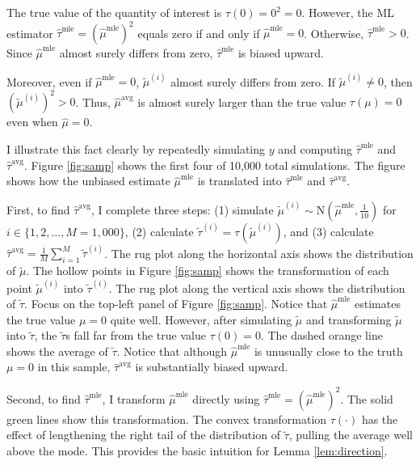 \documentclass[12pt]{article}
\begin{document}
The true value of the quantity of interest is $\tau(0) = 0^2 = 0$. However, the ML estimator $\hat{\tau}^\text{mle} = \left( \hat{\mu}^\text{mle} \right)^2$ equals zero if and only if $\hat{\mu}^\text{mle} = 0$. Otherwise, $\hat{\tau}^\text{mle} > 0$. Since $\hat{\mu}^\text{mle}$ almost surely differs from zero,  $\hat{\tau}^\text{mle}$ is biased upward.

Moreover, even if $\hat{\mu}^\text{mle} = 0$, $\tilde{\mu}^{(i)}$ almost surely differs from zero. If $\tilde{\mu}^{(i)} \neq 0$, then $\left( \tilde{\mu}^{(i)} \right)^2 > 0$. Thus, $\hat{\mu}^\text{avg}$ is almost surely larger than the true value $\tau(\mu) = 0$ even when $\hat{\mu} = 0$.

I illustrate this fact clearly by repeatedly simulating $y$ and computing $\hat{\tau}^\text{mle}$ and $\hat{\tau}^\text{avg}$. Figure \ref{fig:samp} shows the first four of 10,000 total simulations. The figure shows how the unbiased estimate $\hat{\mu}^\text{mle}$ is translated into $\hat{\tau}^\text{mle}$ and $\hat{\tau}^\text{avg}$.

First, to find $\hat{\tau}^\text{avg}$, I complete three steps: (1) simulate $\tilde{\mu}^{(i)} \sim \text{N} \left( \hat{\mu}^\text{mle}, \frac{1}{10{}} \right)$ for $i \in \{1, 2,\ldots, M = 1,000\}$, (2) calculate $\tilde{\tau}^{(i)} = \tau\left( \tilde{\mu}^{(i)} \right)$, and (3) calculate $\hat{\tau}^\text{avg} = \frac{1}{M} \sum_{i = 1}^M \tilde{\tau}^{(i)}$. The rug plot along the horizontal axis shows the distribution of $\tilde{\mu}$. The hollow points in Figure \ref{fig:samp} shows the transformation of each point $\tilde{\mu}^{(i)}$ into $\tilde{\tau}^{(i)}$. The rug plot along the vertical axis shows the distribution of $\tilde{\tau}$.
Focus on the top-left panel of Figure \ref{fig:samp}. Notice that $\hat{\mu}^\text{mle}$ estimates the true value $\mu = 0$ quite well. However, after simulating $\tilde{\mu}$ and transforming $\tilde{\mu}$ into $\tilde{\tau}$, the $\tilde{\tau}$s fall far from the true value $\tau(0) = 0$. The dashed orange line shows the average of $\tilde{\tau}$. Notice that although $\hat{\mu}^\text{mle}$ is unusually close to the truth $\mu = 0$ in this sample, $\hat{\tau}^\text{avg}$ is substantially biased upward.

Second, to find $\hat{\tau}^\text{mle}$, I transform $\hat{\mu}^\text{mle}$ directly using $\hat{\tau}^\text{mle} = \left( \hat{\mu}^\text{mle} \right) ^2$.
The solid green lines show this transformation.
The convex transformation $\tau(\cdot)$ has the effect of lengthening the right tail of the distribution of $\tilde{\tau}$, pulling the average well above the mode.
This provides the basic intuition for Lemma \ref{lem:direction}.
\end{document}
